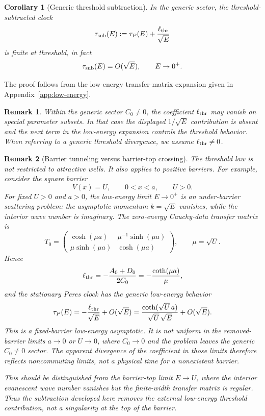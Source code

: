 \documentclass[aps,pra,preprint,notitlepage,nofootinbib]{revtex4-2}
\newtheorem{corollary}{Corollary}
\newtheorem{remark}{Remark}
\begin{document}
\begin{corollary}[Generic threshold subtraction]
\label{cor:general-threshold-body}
In the generic sector, the threshold-subtracted clock
\begin{equation}
\tau_{\rm sub}(E):=\tau_P(E)+\frac{\ell_{\rm thr}}{\sqrt{E}}
\label{eq:tausub-body}
\end{equation}
is finite at threshold, in fact
\begin{equation}
\tau_{\rm sub}(E)=O(\sqrt{E}),
\qquad E\to0^+.
\label{eq:tausub-threshold-body}
\end{equation}
\end{corollary}

The proof follows from the low-energy transfer-matrix expansion given in Appendix~\ref{app:low-energy}.

\begin{remark}
Within the generic sector \(C_0\neq0\), the coefficient \(\ell_{\rm thr}\) may vanish on special parameter subsets. In that case the displayed \(1/\sqrt E\) contribution is absent and the next term in the low-energy expansion controls the threshold behavior. When referring to a generic threshold divergence, we assume \(\ell_{\rm thr}\neq0\).
\end{remark}

\begin{remark}[Barrier tunneling versus barrier-top crossing]
The threshold law is not restricted to attractive wells. It also applies to
positive barriers. For example, consider the square barrier
\[
V(x)=U,\qquad 0<x<a,\qquad U>0 .
\]
For fixed \(U>0\) and \(a>0\), the low-energy limit \(E\to0^+\) is an
under-barrier scattering problem: the asymptotic momentum \(k=\sqrt E\)
vanishes, while the interior wave number is imaginary. The zero-energy
Cauchy-data transfer matrix is
\[
T_0=
\begin{pmatrix}
\cosh(\mu a) & \mu^{-1}\sinh(\mu a)\\
\mu\sinh(\mu a) & \cosh(\mu a)
\end{pmatrix},
\qquad \mu=\sqrt U .
\]
Hence
\[
\ell_{\rm thr}
=
-\frac{A_0+D_0}{2C_0}
=
-\frac{\coth(\mu a)}{\mu},
\]
and the stationary Peres clock has the generic low-energy behavior
\[
\tau_P(E)
=
-\frac{\ell_{\rm thr}}{\sqrt E}
+O(\sqrt E)
=
\frac{\coth(\sqrt U\,a)}{\sqrt U\,\sqrt E}
+O(\sqrt E).
\]
This is a fixed-barrier low-energy asymptotic. It is not uniform in the
removed-barrier limits \(a\to0\) or \(U\to0\), where \(C_0\to0\) and the
problem leaves the generic \(C_0\neq0\) sector. The apparent divergence of the
coefficient in those limits therefore reflects noncommuting limits, not a
physical time for a nonexistent barrier.

This should be distinguished from the barrier-top limit \(E\to U\), where the
interior evanescent wave number vanishes but the finite-width transfer matrix
is regular. Thus the subtraction developed here removes the external
low-energy threshold contribution, not a singularity at the top of the barrier.
\end{remark}
\end{document}
